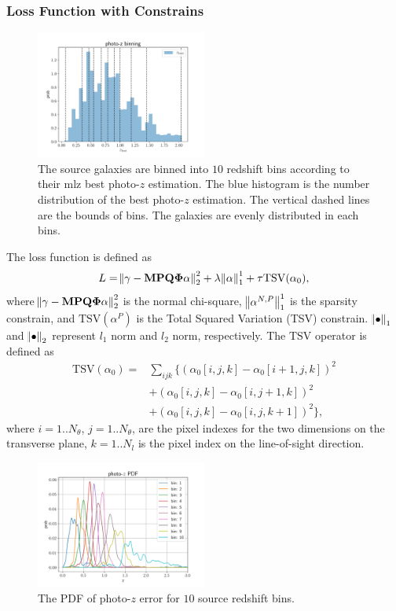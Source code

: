 \documentclass[twocolumn]{aastex62}
\begin{document}
\subsubsection{Loss Function with Constrains}
\begin{figure}
 \centering
 \includegraphics[width=0.5\textwidth]{photo-z_binning.pdf}
 \caption{The source galaxies are binned into $10$ redshift bins according to their mlz best photo-$z$ estimation. The blue histogram is the number distribution of the best photo-$z$ estimation. The vertical dashed lines are the bounds of bins. The galaxies are evenly distributed in each bins.}
\end{figure}

The loss function is defined as
\begin{equation}\label{eq-lossFun}
L = \norm{\gamma-\mathbf{M}\mathbf{P}\mathbf{Q}\mathbf{\Phi} \alpha}^2_2+\lambda \norm{\alpha}^1_1 + \tau\mathrm{TSV}(\alpha_0),
\end{equation}
where $\norm{\gamma-\mathbf{M}\mathbf{P}\mathbf{Q}\mathbf{\Phi} \alpha}^2_2$ is the normal chi-square, $\norm{\alpha^{N,P}}^1_1$ is the sparsity constrain, and $\mathrm{TSV}(\alpha^P)$ is the Total Squared Variation (TSV) constrain. $\norm{\bullet}_1$ and $\norm{\bullet}_2$ represent $l_1$ norm and $l_2$ norm, respectively.
The $\mathrm{TSV}$ operator is defined as
\begin{equation}
\begin{split}
\mathrm{TSV}(\alpha_0) =&  \sum_{ijk} \{ (\alpha_0[i,j,k]-\alpha_0[i+1,j,k])^2\\
&+(\alpha_0[i,j,k]-\alpha_0[i,j+1,k])^2\\
&+(\alpha_0[i,j,k]-\alpha_0[i,j,k+1])^2 \},
\end{split}
\end{equation}
where $i=1..N_\theta$, $j=1..N_\theta$, are the pixel indexes for the two dimensions on the transverse plane, $k=1..N_l$ is the pixel index on the line-of-sight direction.

\begin{figure}
 \centering
 \includegraphics[width=0.5\textwidth]{mlz-poz.pdf}
 \caption{The PDF of photo-$z$ error for $10$ source redshift bins.}
\end{figure}
\end{document}
